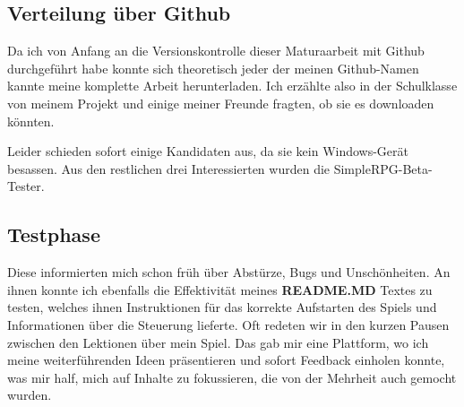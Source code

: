 \subsection{Verteilung über Github}

Da ich von Anfang an die Versionskontrolle dieser Maturaarbeit mit Github durchgeführt habe konnte sich theoretisch jeder der meinen Github-Namen kannte meine komplette Arbeit herunterladen.\cite{csomormaturaarbeit19github}
Ich erzählte also in der Schulklasse von meinem Projekt und einige meiner Freunde fragten, ob sie es downloaden könnten.

Leider schieden sofort einige Kandidaten aus, da sie kein Windows-Gerät besassen. Aus den restlichen drei Interessierten wurden die SimpleRPG-Beta-Tester.

\subsection{Testphase}

Diese informierten mich schon früh über Abstürze, Bugs und Unschönheiten.
An ihnen konnte ich ebenfalls die Effektivität meines \textbf{README.MD} Textes zu testen, welches ihnen Instruktionen für das korrekte Aufstarten des Spiels und Informationen über die Steuerung lieferte.
Oft redeten wir in den kurzen Pausen zwischen den Lektionen über mein Spiel.
Das gab mir eine Plattform, wo ich meine weiterführenden Ideen präsentieren und sofort Feedback einholen konnte, was mir half, mich auf Inhalte zu fokussieren, die von der Mehrheit auch gemocht wurden.


